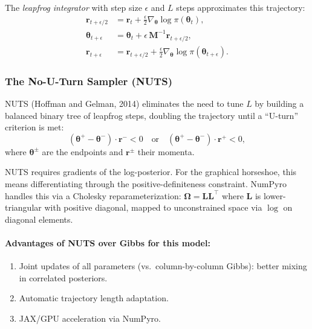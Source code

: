 \documentclass[11pt,a4paper]{article}
\newcommand{\bOmega}{\bm{\Omega}}
\begin{document}
The \emph{leapfrog integrator} with step size $\epsilon$ and $L$ steps approximates this trajectory:
\begin{align}
  \bm{r}_{t+\epsilon/2} &= \bm{r}_t + \frac{\epsilon}{2}\nabla_{\bm{\theta}}\log\pi(\bm{\theta}_t), \\
  \bm{\theta}_{t+\epsilon} &= \bm{\theta}_t + \epsilon\,\bm{M}^{-1}\bm{r}_{t+\epsilon/2}, \\
  \bm{r}_{t+\epsilon} &= \bm{r}_{t+\epsilon/2} + \frac{\epsilon}{2}\nabla_{\bm{\theta}}\log\pi(\bm{\theta}_{t+\epsilon}).
\end{align}

\subsubsection{The No-U-Turn Sampler (NUTS)}

NUTS (Hoffman and Gelman, 2014) eliminates the need to tune $L$ by building a balanced binary tree of leapfrog steps, doubling the trajectory until a ``U-turn'' criterion is met:
\begin{equation}
  (\bm{\theta}^+ - \bm{\theta}^-)\cdot\bm{r}^- < 0 \quad \text{or} \quad (\bm{\theta}^+ - \bm{\theta}^-)\cdot\bm{r}^+ < 0,
\end{equation}
where $\bm{\theta}^{\pm}$ are the endpoints and $\bm{r}^{\pm}$ their momenta.

\begin{keyinsight}
NUTS requires gradients of the log-posterior. For the graphical horseshoe, this means differentiating through the positive-definiteness constraint. NumPyro handles this via a Cholesky reparameterization: $\bOmega = \bm{L}\bm{L}^\top$ where $\bm{L}$ is lower-triangular with positive diagonal, mapped to unconstrained space via $\log$ on diagonal elements.
\end{keyinsight}

\paragraph{Advantages of NUTS over Gibbs for this model:}
\begin{enumerate}[nosep]
  \item Joint updates of all parameters (vs.\ column-by-column Gibbs): better mixing in correlated posteriors.
  \item Automatic trajectory length adaptation.
  \item JAX/GPU acceleration via NumPyro.
\end{enumerate}
\end{document}
